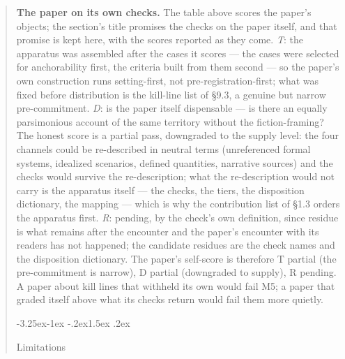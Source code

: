 \documentclass[11pt,a4paper]{article}
\makeatletter
\renewcommand\subsection{\@startsection{subsection}{2}{\z@}%
  {-3.25ex\@plus -1ex \@minus -.2ex}{1.5ex \@plus .2ex}%
  {\normalfont\large\bfseries\raggedright}}
\makeatother
\begin{document}
\begin{abstract}
\textbf{The paper on its own checks.} The table above scores the paper's objects; the section's title promises the checks on the paper itself, and that promise is kept here, with the scores reported as they come. \textit{T}: the apparatus was assembled after the cases it scores — the cases were selected for anchorability first, the criteria built from them second — so the paper's own construction runs setting-first, not pre-registration-first; what was fixed before distribution is the kill-line list of §9.3, a genuine but narrow pre-commitment. \textit{D}: is the paper itself dispensable — is there an equally parsimonious account of the same territory without the fiction-framing? The honest score is a partial pass, downgraded to the supply level: the four channels could be re-described in neutral terms (unreferenced formal systems, idealized scenarios, defined quantities, narrative sources) and the checks would survive the re-description; what the re-description would not carry is the apparatus itself — the checks, the tiers, the disposition dictionary, the mapping — which is why the contribution list of §1.3 orders the apparatus first. \textit{R}: pending, by the check's own definition, since residue is what remains after the encounter and the paper's encounter with its readers has not happened; the candidate residues are the check names and the disposition dictionary. The paper's self-score is therefore T partial (the pre-commitment is narrow), D partial (downgraded to supply), R pending. A paper about kill lines that withheld its own would fail M5; a paper that graded itself above what its checks return would fail them more quietly.

\subsection{Limitations}


\end{abstract}
\end{document}

